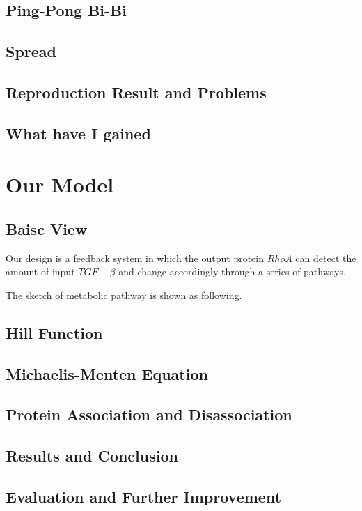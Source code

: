 \documentclass[12pt]{article}
\begin{document}
\subsection{Ping-Pong Bi-Bi}
\subsection{Spread}
\subsection{Reproduction Result and Problems}
\subsection{What have I gained}


\section{Our Model}
\subsection{Baisc View}
Our design is a feedback system in which the output protein $RhoA$ can detect the amount of input $TGF-\beta$ and change accordingly through a series of pathways.

The sketch of metabolic pathway is shown as following.

\subsection{Hill Function}
\subsection{Michaelis-Menten Equation}
\subsection{Protein Association and Disassociation}
\subsection{Results and Conclusion}
\subsection{Evaluation and Further Improvement}
\end{document}
